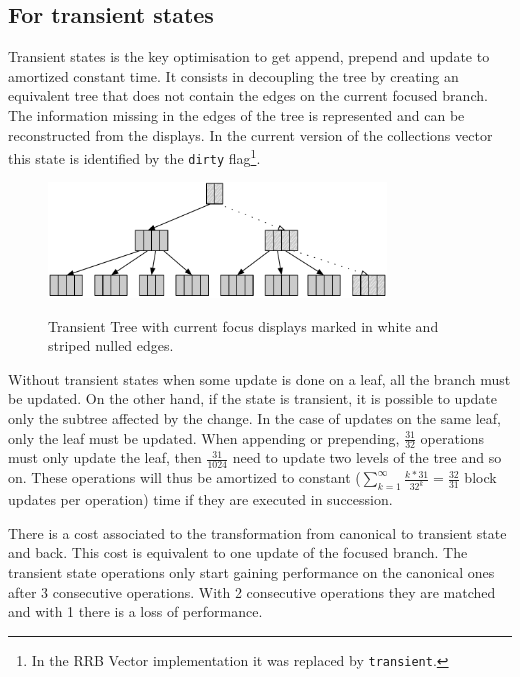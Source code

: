 \subsection{For transient states}
\label{sec:DisplaysTransient}
Transient states is the key optimisation to get append, prepend and update to amortized constant time. It consists in decoupling the tree by creating an equivalent tree that does not contain the edges on the current focused branch. The information missing in the edges of the tree is represented and can be reconstructed from the displays. In the current version of the collections vector \cite{scalaVector211} this state is identified by the \texttt{dirty} flag\footnote{In the RRB Vector \cite{projecRepo} implementation it was replaced by \texttt{transient}.}.

\begin{figure}[h!]
  \centering
  \includegraphics[width=0.8\textwidth]{Figures/Transient_state}
  \label{Transient_state}
  \caption{Transient Tree with current focus displays marked in white and striped nulled edges.}
\end{figure}

Without transient states when some update is done on a leaf, all the branch must be updated. On the other hand, if the state is transient, it is possible to update only the subtree affected by the change. In the case of updates on the same leaf, only the leaf must be updated. When appending or prepending, $\frac{31}{32}$ operations must only update the leaf, then $\frac{31}{1024}$ need to update two levels of the tree and so on. These operations will thus be amortized to constant ($\sum_{k=1}^{\infty} \frac{k*31}{32^k} = \frac{32}{31}$ block updates per operation) time if they are executed in succession.

There is a cost associated to the transformation from canonical to transient state and back. This cost is equivalent to one update of the focused branch. The transient state operations only start gaining performance on the canonical ones after 3 consecutive operations. With 2 consecutive operations they are matched and with 1 there is a loss of performance.

